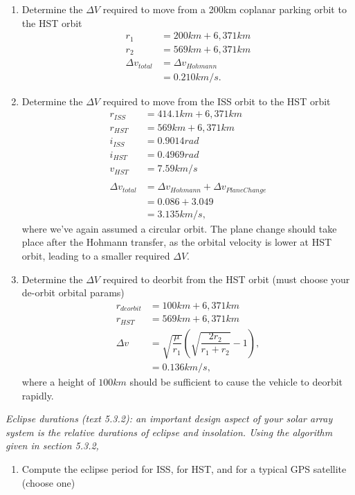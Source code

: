 \documentclass[onecolumn,10pt]{jhwhw}
\begin{document}
\begin{enumerate}
\itemsep0em
\item Determine the $\Delta V$ required to move from a 200km coplanar parking orbit to the HST orbit
\begin{align*}
r_1 &= 200 km + 6,371 km \\
r_2 &= 569 km + 6,371 km \\
\Delta v_{total} &= \Delta v_{Hohmann} \\
                 &= 0.210 km/s.
\end{align*}
\item Determine the $\Delta V$ required to move from the ISS orbit to the HST orbit
\begin{align*}
r_{ISS} &= 414.1 km + 6,371 km \\
r_{HST} &= 569 km + 6,371 km \\
i_{ISS} &= 0.9014 rad \\
i_{HST} &= 0.4969 rad \\
v_{HST} &= 7.59 km/s \\
\\
\Delta v_{total} &= \Delta v_{Hohmann} + \Delta v_{Plane Change} \\
                 &= 0.086 + 3.049 \\
                 &= 3.135 km/s,
\end{align*}
where we've again assumed a circular orbit. The plane change should take place after the Hohmann transfer, as the orbital velocity is lower at HST orbit, leading to a smaller required $\Delta V$.

\item Determine the $\Delta V$ required to deorbit from the HST orbit (must choose your de-orbit orbital params)
\begin{align*}
r_{deorbit} &= 100 km + 6,371 km \\
r_{HST} &= 569 km + 6,371 km \\
\Delta v &= \sqrt{\dfrac{\mu}{r_1}} \left(\sqrt{\dfrac{2r_2}{r_1 + r_2}} -1 \right), \\
         &= 0.136 km/s,
\end{align*}
where a height of $100km$ should be sufficient to cause the vehicle to deorbit rapidly.

\end{enumerate}
\clearpage

\problem{}
\textit{Eclipse durations (text 5.3.2): an important design aspect of your solar array system is the relative durations of eclipse and insolation. Using the algorithm given in section 5.3.2,}
\begin{enumerate}
\itemsep0em
\item Compute the eclipse period for ISS, for HST, and for a typical GPS satellite (choose one)
\end{enumerate}
\clearpage
\end{document}
